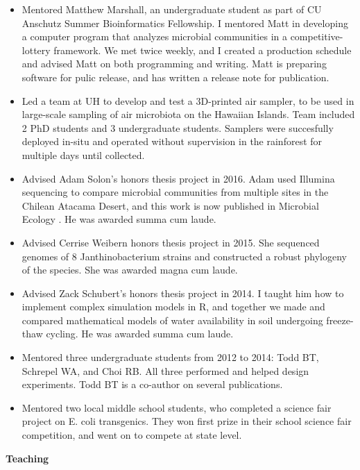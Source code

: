 \documentclass{article}
\begin{document}
\begin{itemize}[noitemsep,topsep=0pt, leftmargin=5mm]
  \item Mentored Matthew Marshall, an undergraduate student as part of CU Anschutz Summer Bioinformatics Fellowship. I mentored Matt in developing a computer program that analyzes microbial communities in a competitive-lottery framework. We met twice weekly, and I created a production schedule and advised Matt on both programming and writing. Matt is preparing software for pulic release, and has written a release note for publication.
  \item Led a team at UH to develop and test a 3D-printed air sampler, to be used in large-scale sampling of air microbiota on the Hawaiian Islands. Team included 2 PhD students and 3 undergraduate students. Samplers were succesfully deployed in-situ and operated without supervision in the rainforest for multiple days until collected.
  \item Advised Adam Solon's honors thesis project in 2016. Adam used Illumina sequencing to compare microbial communities from multiple sites in the Chilean Atacama Desert, and this work is now published in Microbial Ecology \cite{Solon2018}. He was awarded summa cum laude.
  \item Advised Cerrise Weibern honors thesis project in 2015. She sequenced genomes of 8 Janthinobacterium strains and constructed a robust phylogeny of the species. She was awarded magna cum laude.
  \item Advised Zack Schubert's honors thesis project in 2014. I taught him how to implement complex simulation models in R, and together we made and compared mathematical models of water availability in soil undergoing freeze-thaw cycling. He was awarded summa cum laude.
  \item Mentored three undergraduate students from 2012 to 2014: Todd BT, Schrepel WA, and Choi RB. All three performed and helped design experiments. Todd BT is a co-author on several publications.
  \item Mentored two local middle school students, who completed a science fair project on E. coli transgenics. They won first prize in their school science fair competition, and went on to compete at state level.
\end{itemize}
\vspace{3mm}
{\large  \textbf{Teaching}}
\end{document}
